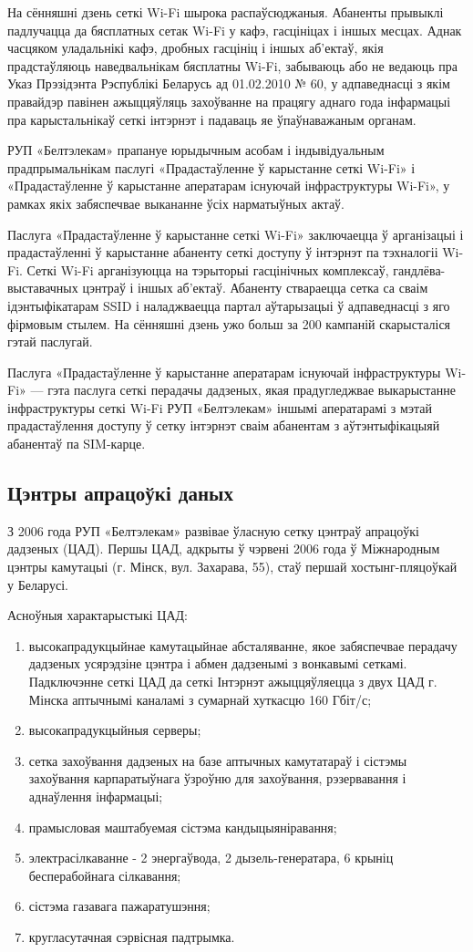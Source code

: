 На сённяшні дзень сеткі Wi-Fi шырока распаўсюджаныя. Абаненты прывыклі падлучацца да бясплатных сетак Wi-Fi у кафэ, гасцініцах і іншых месцах. Аднак часцяком уладальнікі кафэ, дробных гасцініц і іншых аб'ектаў, якія прадстаўляюць наведвальнікам бясплатны Wi-Fi, забываюць або не ведаюць пра Указ Прэзідэнта Рэспублікі Беларусь ад 01.02.2010 № 60, у адпаведнасці з якім правайдэр павінен ажыццяўляць захоўванне на працягу аднаго года інфармацыі пра карыстальнікаў сеткі інтэрнэт і падаваць яе ўпаўнаважаным органам.

РУП «Белтэлекам» прапануе юрыдычным асобам і індывідуальным прадпрымальнікам паслугі «Прадастаўленне ў карыстанне сеткі Wi-Fi» і «Прадастаўленне ў карыстанне аператарам існуючай інфраструктуры Wi-Fi», у рамках якіх забяспечвае выкананне ўсіх нарматыўных актаў.

Паслуга «Прадастаўленне ў карыстанне сеткі Wi-Fi» заключаецца ў арганізацыі і прадастаўленні ў карыстанне абаненту сеткі доступу ў інтэрнэт па тэхналогіі Wi-Fi. Сеткі Wi-Fi арганізуюцца на тэрыторыі гасцінічных комплексаў, гандлёва-выставачных цэнтраў і іншых аб'ектаў. Абаненту ствараецца сетка са сваім ідэнтыфікатарам SSID і наладжваецца партал аўтарызацыі ў адпаведнасці з яго фірмовым стылем. На сённяшні дзень ужо больш за 200 кампаній скарысталіся гэтай паслугай.

Паслуга «Прадастаўленне ў карыстанне аператарам існуючай інфраструктуры Wi-Fi» --- гэта паслуга сеткі перадачы дадзеных, якая прадугледжвае выкарыстанне інфраструктуры сеткі Wi-Fi РУП «Белтэлекам» іншымі аператарамі з мэтай прадастаўлення доступу ў сетку інтэрнэт сваім абанентам з аўтэнтыфікацыяй абанентаў па SIM-карце.

\subsection{Цэнтры апрацоўкі даных}
З 2006 года РУП «Белтэлекам» развівае ўласную сетку цэнтраў апрацоўкі дадзеных (ЦАД). Першы ЦАД, адкрыты ў чэрвені 2006 года ў Міжнародным цэнтры камутацыі (г. Мінск, вул. Захарава, 55), стаў першай хостынг-пляцоўкай у Беларусі.

Асноўныя характарыстыкі ЦАД:
\begin{enumerate}
    \item высокапрадукцыйнае камутацыйнае абсталяванне, якое забяспечвае перадачу дадзеных усярэдзіне цэнтра і абмен дадзенымі з вонкавымі сеткамі. Падключэнне сеткі ЦАД да сеткі Інтэрнэт ажыццяўляецца з двух ЦАД г. Мінска аптычнымі каналамі з сумарнай хуткасцю 160 Гбіт/с;
    \item высокапрадукцыйныя серверы;
    \item сетка захоўвання дадзеных на базе аптычных камутатараў і сістэмы захоўвання карпаратыўнага ўзроўню для захоўвання, рэзервавання і аднаўлення інфармацыі;
    \item прамысловая маштабуемая сістэма кандыцыяніравання;
    \item электрасілкаванне - 2 энергаўвода, 2 дызель-генератара, 6 крыніц бесперабойнага сілкавання;
    \item сістэма газавага пажаратушэння;
    \item кругласутачная сэрвісная падтрымка.
\end{enumerate}

